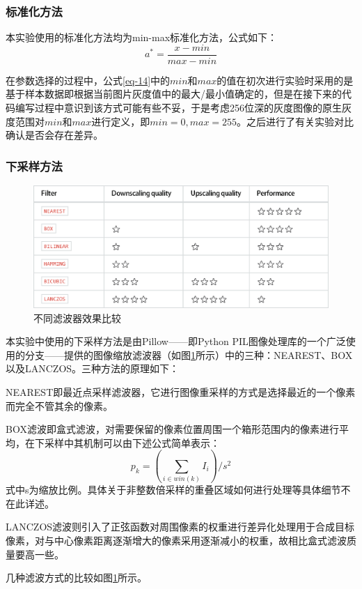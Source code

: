 \documentclass[UTF8]{ctexart}
\begin{document}
\subsubsection{标准化方法}
本实验使用的标准化方法均为min-max标准化方法，公式如下：
\begin{equation}\label{eq-14}
    a^*=\frac{x-min}{max-min}
\end{equation}
\par
在参数选择的过程中，公式\eqref{eq-14}中的\(min\)和\(max\)的值在初次进行实验时采用的是基于样本数据即根据当前图片灰度值中的最大/最小值确定的，但是在接下来的代码编写过程中意识到该方式可能有些不妥，于是考虑256位深的灰度图像的原生灰度范围对\(min\)和\(max\)进行定义，即\(min=0,max=255\)。之后进行了有关实验对比确认是否会存在差异。
\subsubsection{下采样方法}
\begin{figure}[h]
    \centering
    \includegraphics[scale = 0.7]{Filter.eps}
    \caption{不同滤波器效果比较}\label{fig-filter_comparison}
\end{figure}
本实验中使用的下采样方法是由Pillow——即Python PIL图像处理库的一个广泛使用的分支——提供的图像缩放滤波器（如图\ref{fig-filter_comparison}所示）中的三种：NEAREST、BOX以及LANCZOS。三种方法的原理如下：\par
NEAREST即最近点采样滤波器，它进行图像重采样的方式是选择最近的一个像素而完全不管其余的像素。\par
BOX滤波即盒式滤波，对需要保留的像素位置周围一个箱形范围内的像素进行平均，在下采样中其机制可以由下述公式简单表示：
\begin{equation}\label{eq-15}
    p_k=\left({\sum_{i\in win(k)}{I_i}}\right)/s^2
\end{equation}
式中s为缩放比例。具体关于非整数倍采样的重叠区域如何进行处理等具体细节不在此详述。\par
LANCZOS滤波则引入了正弦函数对周围像素的权重进行差异化处理用于合成目标像素，对与中心像素距离逐渐增大的像素采用逐渐减小的权重，故相比盒式滤波质量要高一些。\par
几种滤波方式的比较如图\ref{fig-filter_comparison}所示。
\end{document}
